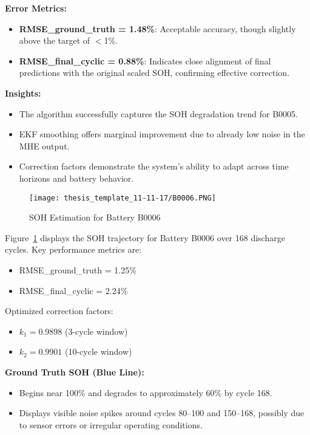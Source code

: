\vspace{0.5em}
\textbf{Error Metrics:}
\begin{itemize}
    \item \textbf{RMSE\_ground\_truth = 1.48\%}: Acceptable accuracy, though slightly above the target of $<$1\%.
    \item \textbf{RMSE\_final\_cyclic = 0.88\%}: Indicates close alignment of final predictions with the original scaled SOH, confirming effective correction.
\end{itemize}

\vspace{0.5em}
\textbf{Insights:}
\begin{itemize}
    \item The algorithm successfully captures the SOH degradation trend for B0005.
    \item EKF smoothing offers marginal improvement due to already low noise in the MHE output.
    \item Correction factors demonstrate the system’s ability to adapt across time horizons and battery behavior.
\end{itemize}

\begin{figure}
    \centering
    \texttt{[image: thesis\_template\_11-11-17/B0006.PNG]}
    \caption{SOH Estimation for Battery B0006}
    \label{fig:resB0006}
\end{figure}

Figure~\ref{fig:resB0006} displays the SOH trajectory for Battery B0006 over 168 discharge cycles. Key performance metrics are:
\begin{itemize}
    \item RMSE\_ground\_truth = 1.25\%
    \item RMSE\_final\_cyclic = 2.24\%
\end{itemize}
Optimized correction factors:
\begin{itemize}
    \item $k_1 = 0.9898$ (3-cycle window)
    \item $k_2 = 0.9901$ (10-cycle window)
\end{itemize}

\vspace{0.5em}
\textbf{Ground Truth SOH (Blue Line):}
\begin{itemize}
    \item Begins near 100\% and degrades to approximately 60\% by cycle 168.
    \item Displays visible noise spikes around cycles 80--100 and 150--168, possibly due to sensor errors or irregular operating conditions.
\end{itemize}

